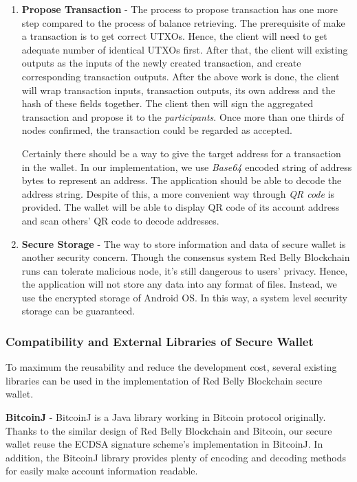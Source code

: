 \documentclass[12pt]{article}
\begin{document}
\begin{enumerate}
   \item \textbf{Propose Transaction} - The process to propose transaction has one more step compared to the process of balance retrieving. The prerequisite of make a transaction is to get correct UTXOs. Hence, the client will need to get adequate number of identical UTXOs first. After that, the client will existing outputs as the inputs of the newly created transaction, and create corresponding transaction outputs. After the above work is done, the client will wrap transaction inputs, transaction outputs, its own address and the hash of these fields together. The client then will sign the aggregated transaction and propose it to the \textit{participants}. Once more than one thirds of nodes confirmed, the transaction could be regarded as accepted.

   Certainly there should be a way to give the target address for a transaction in the wallet. In our implementation, we use \textit{Base64} encoded string of address bytes to represent an address. The application should be able to decode the address string. Despite of this, a more convenient way through \textit{QR code} is provided. The wallet will be able to display QR code of its account address and scan others' QR code to decode addresses. 

   \item \textbf{Secure Storage} - The way to store information and data of secure wallet is another security concern. Though the consensus system Red Belly Blockchain runs can tolerate malicious node, it's still dangerous to users' privacy. Hence, the application will not store any data into any format of files. Instead, we use the encrypted storage of Android OS. In this way, a system level security storage can be guaranteed.
\end{enumerate}

\subsubsection{Compatibility and External Libraries of Secure Wallet}

To maximum the reusability and reduce the development cost, several existing libraries can be used in the implementation of Red Belly Blockchain secure wallet.

\textbf{BitcoinJ} - BitcoinJ is a Java library working in Bitcoin protocol originally. Thanks to the similar design of Red Belly Blockchain and Bitcoin, our secure wallet reuse the ECDSA signature scheme's implementation in BitcoinJ. In addition, the BitcoinJ library provides plenty of encoding and decoding methods for easily make account information readable.
\end{document}
